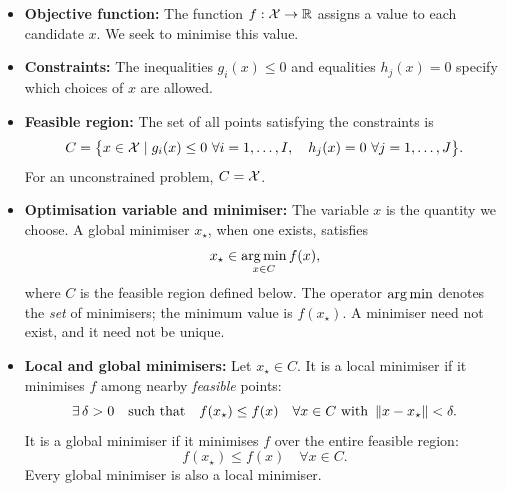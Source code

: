 \begin{itemize}
    \item \textbf{Objective function:} The function $f:{\mathcal X}\to\mathbb{R}$ assigns a value to each candidate $x$. We seek to minimise this value.
    \item \textbf{Constraints:} The inequalities $g_i(x)\leq 0$ and equalities $h_j(x)=0$ specify which choices of $x$ are allowed.
    \item \textbf{Feasible region:} The set of all points satisfying the constraints is
    \begin{equation}
        C=\bigl\{x\in{\mathcal X}\mid g_i(x)\leq 0\ \forall i=1,\ldots,I,\quad
        h_j(x)=0\ \forall j=1,\ldots,J\bigr\}.
    \end{equation}
    For an unconstrained problem, $C={\mathcal X}$.
    \item \textbf{Optimisation variable and minimiser:} The variable $x$ is the quantity we choose. A global minimiser $x_\star$, when one exists, satisfies
    \begin{equation}
        x_\star\in\operatorname*{arg\,min}_{x\in C} f(x),
    \end{equation}
    where $C$ is the feasible region defined below. The operator $\operatorname*{arg\,min}$ denotes the \emph{set} of minimisers; the minimum value is $f(x_\star)$. A minimiser need not exist, and it need not be unique.
    \item \textbf{Local and global minimisers:} Let $x_\star\in C$. It is a local minimiser if it minimises $f$ among nearby \emph{feasible} points:
    \begin{equation}
        \exists\,\delta>0\quad\text{such that}\quad
        f(x_\star)\leq f(x)\quad
        \forall x\in C\text{ with }\left\lVert x-x_\star\right\rVert<\delta.
    \end{equation}
    It is a global minimiser if it minimises $f$ over the entire feasible region:
    \begin{equation}
        f(x_\star)\leq f(x)\quad\forall x\in C.
    \end{equation}
    Every global minimiser is also a local minimiser.
\end{itemize}


